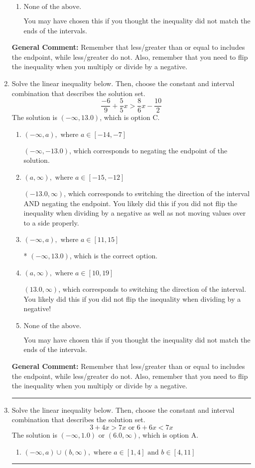 \documentclass{extbook}[14pt]
\newcommand{\litem}[1]{\item #1

\rule{\textwidth}{0.4pt}}
\begin{document}
\begin{enumerate}
{\begin{enumerate}[label=\Alph*.]
 $(-\infty, -2.5]$, which corresponds to switching the direction of the interval. You likely did this if you did not flip the inequality when dividing by a negative!
\item \( \text{None of the above}. \)

You may have chosen this if you thought the inequality did not match the ends of the intervals.
\end{enumerate}

\textbf{General Comment:} Remember that less/greater than or equal to includes the endpoint, while less/greater do not. Also, remember that you need to flip the inequality when you multiply or divide by a negative.
}
\litem{
Solve the linear inequality below. Then, choose the constant and interval combination that describes the solution set.
\[ \frac{-6}{9} + \frac{5}{5} x > \frac{8}{6} x - \frac{10}{2} \]
The solution is \( (-\infty, 13.0) \), which is option C.\begin{enumerate}[label=\Alph*.]
\item \( (-\infty, a), \text{ where } a \in [-14, -7] \)

 $(-\infty, -13.0)$, which corresponds to negating the endpoint of the solution.
\item \( (a, \infty), \text{ where } a \in [-15, -12] \)

 $(-13.0, \infty)$, which corresponds to switching the direction of the interval AND negating the endpoint. You likely did this if you did not flip the inequality when dividing by a negative as well as not moving values over to a side properly.
\item \( (-\infty, a), \text{ where } a \in [11, 15] \)

* $(-\infty, 13.0)$, which is the correct option.
\item \( (a, \infty), \text{ where } a \in [10, 19] \)

 $(13.0, \infty)$, which corresponds to switching the direction of the interval. You likely did this if you did not flip the inequality when dividing by a negative!
\item \( \text{None of the above}. \)

You may have chosen this if you thought the inequality did not match the ends of the intervals.
\end{enumerate}

\textbf{General Comment:} Remember that less/greater than or equal to includes the endpoint, while less/greater do not. Also, remember that you need to flip the inequality when you multiply or divide by a negative.
}
\litem{
Solve the linear inequality below. Then, choose the constant and interval combination that describes the solution set.
\[ 3 + 4 x > 7 x \text{ or } 6 + 6 x < 7 x \]
The solution is \( (-\infty, 1.0) \text{ or } (6.0, \infty) \), which is option A.\begin{enumerate}[label=\Alph*.]
\item \( (-\infty, a) \cup (b, \infty), \text{ where } a \in [1, 4] \text{ and } b \in [4, 11] \)


\end{enumerate}}
\end{enumerate}
\end{document}
